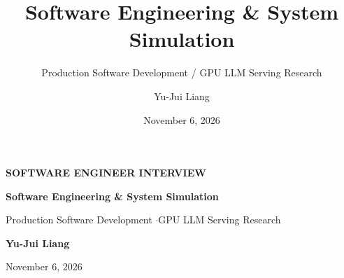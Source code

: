 \documentclass[aspectratio=169,10pt]{beamer}
\title[Software Engineering]{Software Engineering \& System Simulation}
\subtitle{Production Software Development / GPU LLM Serving Research}
\author{Yu-Jui Liang}
\institute{National Taiwan University}
\date{November 6, 2026}
\begin{document}
{
\begin{frame}[plain]
  \vspace*{0.82cm}
  {\normalsize\bfseries\color{Accent}SOFTWARE ENGINEER INTERVIEW}\par
  \vspace{0.48cm}
  {\raggedright\fontsize{20}{24}\selectfont\bfseries\color{Ink}
    Software Engineering \& System Simulation\par}
  \vspace{0.34cm}
  {\color{Muted}\fontsize{11}{14}\selectfont Production Software Development \quad$\cdot$\quad GPU LLM Serving Research\par}
  \vspace{0.72cm}
  {\large\bfseries Yu-Jui Liang}\par
  \vspace{0.12cm}
  {\normalsize\color{Muted}November 6, 2026\par}
  \vfill
\end{frame}}
\end{document}
